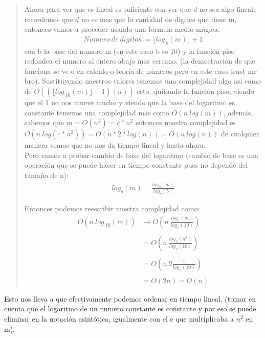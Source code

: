 \begin{quote}
    Ahora para ver que es lineal es suficiente con ver que $d$ no sea algo lineal; recordemos que $d$ no es mas que la cantidad de dígitos que tiene m, entonces vamos a proceder usando una formula medio mágica:
    \begin{align*}
        Numero \ de \ digitos \ = \lfloor log_{\ b}(m)\rfloor +1
    \end{align*}
    con b la base del numero m (en este caso b es 10) y la función piso redondea el numero al entero abajo mas cercano. (la demostración de que funciona se ve o en calculo o teoría de números pero en este caso trust me bro). Sustituyendo nuestros valores tenemos una complejidad algo asi como de $O((\lfloor log_{\ 10}(m)\rfloor +1)(n))$ esto, quitando la función piso, viendo que el 1 no nos mueve mucho y viendo que la base del logaritmo es constante tenemos una complejidad mas como $O(n \ log(m))$, además, sabemos que $m=O(n^2)=c*n^2$ entonces nuestra complejidad es $O(n \ log(c*n^2)) = O(n * 2*log(n)) = O(n \ log(n))$ de cualquier manera vemos que no nos da tiempo lineal y hasta ahora.\\

    Pero vamos a probar cambio de base del logaritmo (cambio de base es una operación que se puede hacer en tiempo constante pues no depende del tamaño de n):
    \begin{align*}
        log_b(m) = \frac{log_n(m)}{log_n(b)}
    \end{align*}

    Entonces podemos reescribir nuestra complejidad como:
    \begin{align*}
        O(n \ log_{\ 10}(m)) &\xrightarrow{} O\left(n \ \frac{log_n(m)}{log_n(10)}\right) \\\\
        &= O\left(n \ \frac{log_n(n^2)}{log_n(10)}\right) \\\\
        &= O\left(n \ 2\frac{1}{log_n(10)}\right) \\\\
        &= O\left(2n \right) = O(n)
    \end{align*}
\end{quote}

Esto nos lleva a que efectivamente podemos ordenar en tiempo lineal. (tomar en cuenta que el logaritmo de un numero constante es constante y por eso se puede eliminar en la notación asintótica, igualmente con el c que multiplicaba a $n^2$ en m).\\